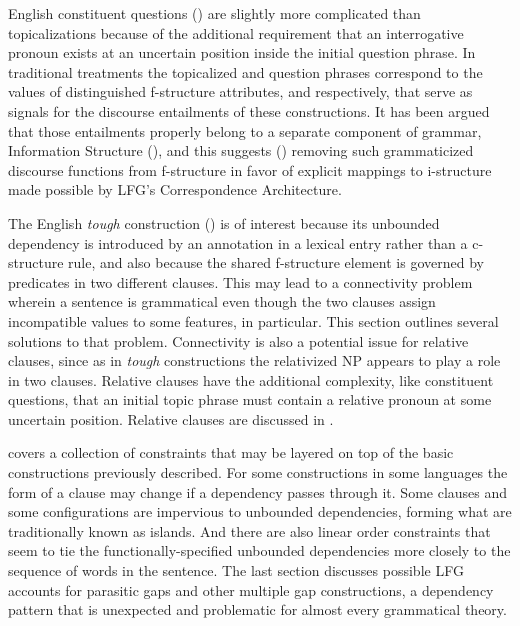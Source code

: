\documentclass[output=paper,hidelinks]{langscibook}
\begin{document}
English constituent questions () are slightly more complicated than topicalizations because of the additional requirement that an interrogative pronoun exists at an uncertain position inside the initial question phrase.  In traditional treatments the topicalized and question phrases correspond to the values of distinguished f-structure attributes, \TOPIC and \FOCUS respectively, that serve as signals for the discourse entailments of these constructions. It has been argued that those entailments properly belong to a separate component of grammar, Information Structure (), and this suggests () removing such grammaticized discourse functions from f-structure in favor of explicit mappings to i-structure made possible by LFG's Correspondence Architecture.

The English \textit{tough} construction () is of interest because its unbounded dependency is introduced by an annotation in a lexical entry rather than a c-structure rule, and also because the shared f-structure element is governed by predicates in two different clauses.  This may lead to a connectivity problem wherein a sentence is grammatical even though the two clauses assign incompatible values to some features, \CASE in particular.  This section outlines several solutions to that problem.  Connectivity is also a potential issue for relative clauses, since as in \textit{tough} constructions the relativized NP appears to play a role in two clauses.  Relative clauses have the additional complexity, like constituent questions, that an initial topic phrase must contain a relative pronoun at some uncertain position.  Relative clauses are discussed in .

 covers a collection of constraints that may be layered on top of the basic constructions previously described. For some constructions in some languages the form of a clause may change if a dependency passes through it. Some clauses and some configurations are impervious to unbounded dependencies, forming what are traditionally known as islands. And there are also linear order constraints that seem to tie the functionally-specified unbounded dependencies more closely to the sequence of words in the sentence.  The last section discusses possible LFG accounts for parasitic gaps and other multiple gap constructions, a dependency pattern that is unexpected and problematic for almost every grammatical theory. 
\end{document}
